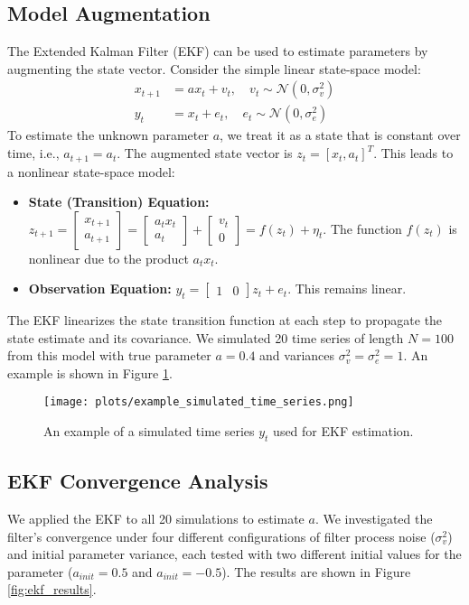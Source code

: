 \documentclass[11pt, a4paper]{article}
\begin{document}
\subsection{Model Augmentation}
The Extended Kalman Filter (EKF) can be used to estimate parameters by augmenting the state vector. Consider the simple linear state-space model:
\begin{align}
    x_{t+1} &= a x_t + v_t, \quad v_t \sim \mathcal{N}(0, \sigma_v^2) \\
    y_t &= x_t + e_t, \quad e_t \sim \mathcal{N}(0, \sigma_e^2)
\end{align}
To estimate the unknown parameter $a$, we treat it as a state that is constant over time, i.e., $a_{t+1} = a_t$. The augmented state vector is $z_t = [x_t, a_t]^T$. This leads to a nonlinear state-space model:
\begin{itemize}
    \item \textbf{State (Transition) Equation:} $z_{t+1} = \begin{bmatrix} x_{t+1} \\ a_{t+1} \end{bmatrix} = \begin{bmatrix} a_t x_t \\ a_t \end{bmatrix} + \begin{bmatrix} v_t \\ 0 \end{bmatrix} = f(z_t) + \eta_t$. The function $f(z_t)$ is nonlinear due to the product $a_t x_t$.
    \item \textbf{Observation Equation:} $y_t = \begin{bmatrix} 1 & 0 \end{bmatrix} z_t + e_t$. This remains linear.
\end{itemize}
The EKF linearizes the state transition function at each step to propagate the state estimate and its covariance. We simulated 20 time series of length $N=100$ from this model with true parameter $a=0.4$ and variances $\sigma_v^2=\sigma_e^2=1$. An example is shown in Figure \ref{fig:sim_y}.

\begin{figure}[H]
    \centering
    \texttt{[image: plots/example\_simulated\_time\_series.png]}
    \caption{An example of a simulated time series $y_t$ used for EKF estimation.}
    \label{fig:sim_y}
\end{figure}

\subsection{EKF Convergence Analysis}
We applied the EKF to all 20 simulations to estimate $a$. We investigated the filter's convergence under four different configurations of filter process noise ($\sigma_v^2$) and initial parameter variance, each tested with two different initial values for the parameter ($a_{init}=0.5$ and $a_{init}=-0.5$). The results are shown in Figure \ref{fig:ekf_results}.
\end{document}
